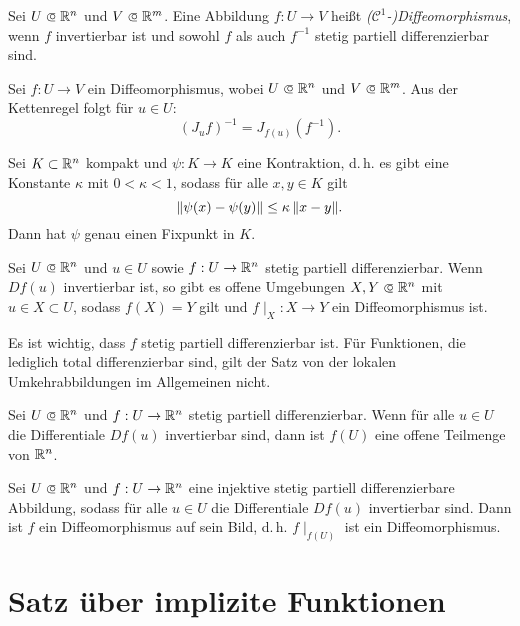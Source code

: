 \documentclass{cheat-sheet}
\begin{document}
\begin{defn}
  Sei $U \opn \R^n$ und $V \opn \R^m$. Eine Abbildung $f : U \to V$ heißt \emph{($\mathcal{C}^1$-)Diffeomorphismus}, wenn $f$ invertierbar ist und sowohl $f$ als auch $f^{-1}$ stetig partiell differenzierbar sind.
\end{defn}

\begin{bem}
  Sei $f : U \to V$ ein Diffeomorphismus, wobei $U \opn \R^n$ und $V \opn \R^m$. Aus der Kettenregel folgt für $u \in U$:
  \[ (J_u f)^{-1} = J_{f(u)}(f^{-1}). \]
\end{bem}

\begin{satz}
  Sei $K \subset \mathbb{R}^n$ kompakt und $\psi : K \to K$ eine Kontraktion, d.\,h. es gibt eine Konstante $\kappa$ mit $0 < \kappa < 1$, sodass für alle $x, y \in K$ gilt
  \[ \lVert\psi(x) - \psi(y)\rVert \le \kappa\, \lVert x - y\rVert. \]
  Dann hat $\psi$ genau einen Fixpunkt in $K$.
\end{satz}

\begin{satz}
  Sei $U \opn \R^n$ und $u \in U$ sowie $f : U \to \mathbb{R}^n$ stetig partiell differenzierbar. Wenn $D f(u)$ invertierbar ist, so gibt es offene Umgebungen $X, Y \opn \R^n$ mit $u \in X \subset U$, sodass $f(X) = Y$ gilt und $f\mid_X : X \to Y$ ein Diffeomorphismus ist.
\end{satz}

\begin{bem}
  Es ist wichtig, dass $f$ stetig partiell differenzierbar ist. Für Funktionen, die lediglich total differenzierbar sind, gilt der Satz von der lokalen Umkehrabbildungen im Allgemeinen nicht.
\end{bem}

\begin{kor}[Offenheitssatz]
  Sei $U \opn \R^n$ und $f : U \to \mathbb{R}^n$ stetig partiell differenzierbar. Wenn für alle $u \in U$ die Differentiale $D f(u)$ invertierbar sind, dann ist $f(U)$ eine offene Teilmenge von $\mathbb{R}^n$.
\end{kor}

\begin{samepage}

\begin{kor}
  Sei $U \opn \R^n$ und $f : U \to \mathbb{R}^n$ eine injektive stetig partiell differenzierbare Abbildung, sodass für alle $u \in U$ die Differentiale $D f(u)$ invertierbar sind. Dann ist $f$ ein Diffeomorphismus auf sein Bild, d.\,h. $f\mid_{f(U)}$ ist ein Diffeomorphismus.
\end{kor}


\section{Satz über implizite Funktionen}

\end{samepage}
\end{document}
